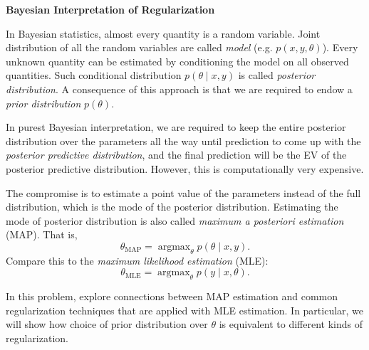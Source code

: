 \documentclass[12pt,letterpaper,boxed]{hmcpset}
\DeclareMathOperator*{\argmax}{argmax}
\begin{document}
\begin{problem}[Problem 3]
  \textbf{Bayesian Interpretation of Regularization}

  In Bayesian statistics, almost every quantity is a random variable. Joint distribution of all the random variables are called \emph{model} (e.g. $p(x,y,\theta)$). Every unknown quantity can be estimated by conditioning the model on all observed quantities. Such conditional distribution $p(\theta \mid x,y)$ is called \emph{posterior distribution}. A consequence of this approach is that we are required to endow a \emph{prior distribution} $p(\theta)$.

  In purest Bayesian interpretation, we are required to keep the entire posterior distribution over the parameters all the way until prediction to come up with the \emph{posterior predictive distribution}, and the final prediction will be the EV of the posterior predictive distribution. However, this is computationally very expensive.

  The compromise is to estimate a point value of the parameters instead of the full distribution, which is the mode of the posterior distribution. Estimating the mode of posterior distribution is also called \emph{maximum a posteriori estimation} (MAP). That is,
  \[
  \theta_{\mathrm{MAP}} = \argmax_{\theta} p(\theta \mid x,y).
  \]
  Compare this to the \emph{maximum likelihood estimation} (MLE):
  \[
  \theta_{\mathrm{MLE}} = \argmax_{\theta} p(y \mid x, \theta).
  \]

  In this problem, explore connections between MAP estimation and common regularization techniques that are applied with MLE estimation. In particular, we will show how choice of prior distribution over $\theta$ is equivalent to different kinds of regularization.
\end{problem}
\end{document}
